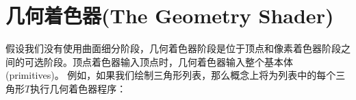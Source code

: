 \chapter{几何着色器(The Geometry Shader)}
\begin{flushleft}
假设我们没有使用曲面细分阶段，几何着色器阶段是位于顶点和像素着色器阶段之间的可选阶段。顶点着色器输入顶点时，几何着色器输入整个基本体(primitives)。 例如，如果我们绘制三角形列表，那么概念上将为列表中的每个三角形$T$执行几何着色器程序：\\
\end{flushleft}


